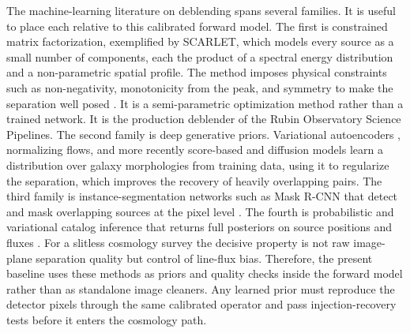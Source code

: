 \documentclass[10pt,onecolumn]{article}
\begin{document}
The machine-learning literature on deblending spans several families. It is useful to place each relative to this calibrated forward model. The first is constrained matrix factorization, exemplified by SCARLET, which models every source as a small number of components, each the product of a spectral energy distribution and a non-parametric spatial profile. The method imposes physical constraints such as non-negativity, monotonicity from the peak, and symmetry to make the separation well posed \cite{scarlet2018}. It is a semi-parametric optimization method rather than a trained network. It is the production deblender of the Rubin Observatory Science Pipelines. The second family is deep generative priors. Variational autoencoders \cite{arcelin2021,lanusse2021}, normalizing flows, and more recently score-based and diffusion models learn a distribution over galaxy morphologies from training data, using it to regularize the separation, which improves the recovery of heavily overlapping pairs. The third family is instance-segmentation networks such as Mask R-CNN that detect and mask overlapping sources at the pixel level \cite{burke2019}. The fourth is probabilistic and variational catalog inference that returns full posteriors on source positions and fluxes \cite{liu2021}. For a slitless cosmology survey the decisive property is not raw image-plane separation quality but control of line-flux bias. Therefore, the present baseline uses these methods as priors and quality checks inside the forward model rather than as standalone image cleaners. Any learned prior must reproduce the detector pixels through the same calibrated operator and pass injection-recovery tests before it enters the cosmology path.
\end{document}
